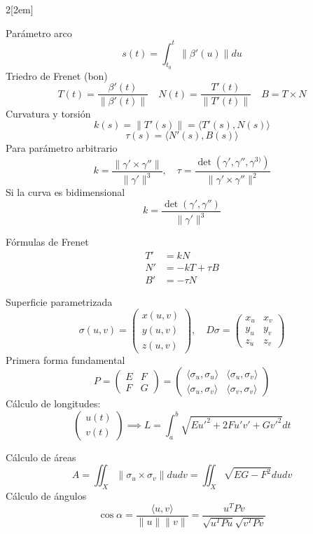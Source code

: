 \documentclass{myclass}
\begin{document}
\begin{multicols}{2}[\columnsep2em]

Parámetro arco 
\[
s(t) = \int_{t_0}^t \|\beta' (u)\| du
\]
Triedro de Frenet (bon)
 \[
   T(t) = \frac{\beta'(t)}{\|\beta'(t)\|} \quad N(t) =
\frac{T'(t)}{\|T'(t)\|} \quad
B = T\times N
\] 
Curvatura y torsión
 \[
k(s) = \|T'(s)\|= \langle T'(s) , N(s) \rangle
\]
\[
  \tau(s) = \langle N'(s) , B(s) \rangle 
\]
Para parámetro arbitrario
\[
k = \frac{\|\gamma' \times \gamma''\|}{\|\gamma'\|^3}, \quad \tau = \frac{\det\left( \gamma', \gamma'', \gamma^{3)} \right) }{\|\gamma'\times \gamma''\|^2}
\]
Si la curva es bidimensional
\[
k = \frac{\det(\gamma',\gamma'')}{\|\gamma'\|^3}
\] 

Fórmulas de Frenet
\begin{align*}
  T' &= kN \\
  N' &= -kT + \tau B \\
  B' &= -\tau N 
\end{align*}

Superficie parametrizada
\[
\sigma(u, v) = \begin{pmatrix} x(u, v) \\ y(u, v) \\ z(u, v) \end{pmatrix}, \quad D\sigma = \begin{pmatrix} x_u & x_v \\ y_u & y_v \\ z_u & z_v \end{pmatrix}
\]
Primera forma fundamental
\[
P =   \begin{pmatrix} E & F \\ F & G \end{pmatrix} = \begin{pmatrix} \langle \sigma_u , \sigma_u \rangle & \langle \sigma_u , \sigma_v \rangle \\ \langle \sigma_u , \sigma_v \rangle & \langle \sigma_v , \sigma_v \rangle   \end{pmatrix} 
\]
Cálculo de longitudes:
\[
\begin{pmatrix} u(t)  \\ v(t) \end{pmatrix} \implies   L = \int_a^b \sqrt{Eu'^2 + 2Fu'v' + Gv'^2}dt
\] 

Cálculo de áreas
\[
A = \iint_X\|\sigma _u\times \sigma _v\|dudv=  \iint_X \sqrt{EG-F^2}dudv
\]
Cálculo de ángulos
\[
\cos \alpha  = \frac{\langle u, v \rangle }{\|u\|\|v\|} = \frac{u^TPv}{\sqrt{u^TPu}\sqrt{v^TPv}  }
\] 


\end{multicols}
\end{document}
